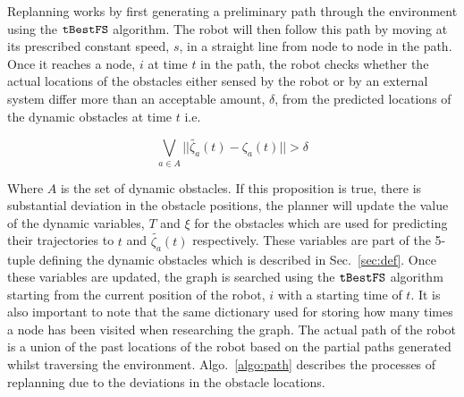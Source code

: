 Replanning works by first generating a preliminary path through the environment
using the $\Acronym{tBestFS}$ algorithm. The robot will then follow this path
by moving at its prescribed constant speed, $s$, in a straight line from node
to node in the path. Once it reaches a node, $i$ at time $t$ in the path, the
robot checks whether the actual locations of the obstacles either sensed by the
robot or by an external system differ more than an acceptable amount, $\delta$,
from the predicted locations of the dynamic obstacles at time $t$ i.e.

$$\bigvee_{a \in A} ||\tilde{\zeta_a}(t) - \zeta_a(t)|| > \delta$$

Where $A$ is the set of dynamic obstacles. If this proposition is true, there
is substantial deviation in the obstacle positions, the planner will update the
value of the dynamic variables, $T$ and $\xi$ for the obstacles which are used
for predicting their trajectories to $t$ and $\tilde{\zeta_a}(t)$ respectively.
These variables are part of the 5-tuple defining the dynamic obstacles which is
described in Sec.~\ref{sec:def}. Once these variables are updated, the graph is
searched using the $\Acronym{tBestFS}$ algorithm starting from the current
position of the robot, $i$ with a starting time of $t$. It is also important to
note that the same dictionary used for storing how many times a node has been
visited when researching the graph. The actual path of the robot is a union of
the past locations of the robot based on the partial paths generated whilst
traversing the environment. Algo.~\ref{algo:path} describes the processes of
replanning due to the deviations in the obstacle locations.

